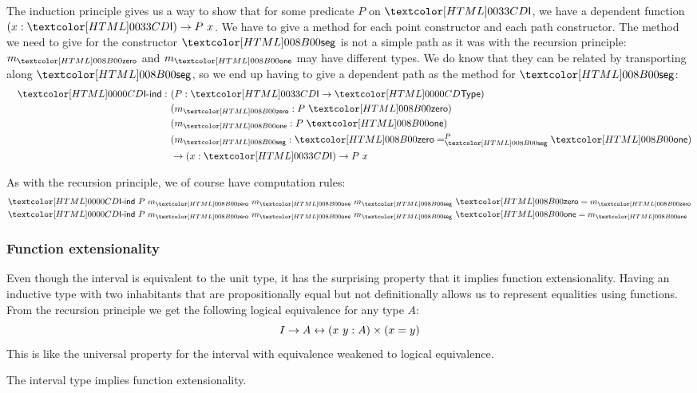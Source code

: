 The induction principle gives us a way to show that for some predicate
$P$ on $\intty$, we have a dependent function $(x : \intty) \to P\ x$.
We have to give a method for each point constructor and each path
constructor. The method we need to give for the constructor $\intseg$
is not a simple path as it was with the recursion principle:
$m_{\intzero}$ and $m_{\intone}$ may have different types. We do know
that they can be related by transporting along $\intseg$, so we end up
having to give a dependent path as the method for $\intseg$:
%
\begin{align*}
&&\intind : &\ (P : \intty \to \Type) \\
&&&\ (m_{\intzero} : P\ \intzero) \\
&&&\ (m_{\intone} : P\ \intone) \\
&&&\ (m_{\intseg} : \pathover{P}{\intseg}{\intzero}{\intone}) \\
&&&\ \to (x : \intty) \to P\ x
\end{align*}

As with the recursion principle, we of course have computation rules:
%
\begin{align*}
  &\intind\ P\ m_{\intzero}\ m_{\intone}\ m_{\intseg}\ \intzero = m_{\intzero} \\
  &\intind\ P\ m_{\intzero}\ m_{\intone}\ m_{\intseg}\ \intone = m_{\intone}
\end{align*}

\subsubsection{Function extensionality}

Even though the interval is equivalent to the unit type, it has the
surprising property that it implies function extensionality. Having an
inductive type with two inhabitants that are propositionally equal but
not definitionally allows us to represent equalities using
functions. From the recursion principle we get the following logical
equivalence for any type $A$:
$$
I \to A \leftrightarrow (x\ y : A) \times (x = y)
$$
This is like the universal property for the interval with equivalence
weakened to logical equivalence.

\begin{proposition}
  \label{int:funext}
  The interval type implies function extensionality.
\end{proposition}

